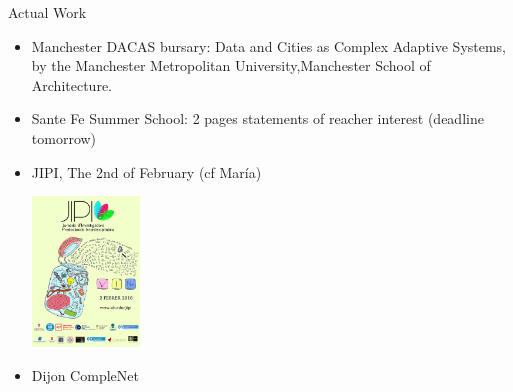 \documentclass[9pt, handout=show,notes=show]{beamer}
\begin{document}
\begin{frame}{Actual Work}
    \begin{itemize}
	\item Manchester DACAS bursary: Data and Cities as Complex Adaptive Systems, by the Manchester Metropolitan University,Manchester School of Architecture.
	    \vfil
	\item Sante Fe Summer School: 2 pages statements of reacher interest (deadline tomorrow)
	    \vfil
	\item JIPI, The 2nd of February (cf María)\\
	    \begin{center}
		\includegraphics[height=4cm]{images/jipi.png}
	    \end{center}
	\item Dijon CompleNet
    \end{itemize}
    
\end{frame}
\end{document}
